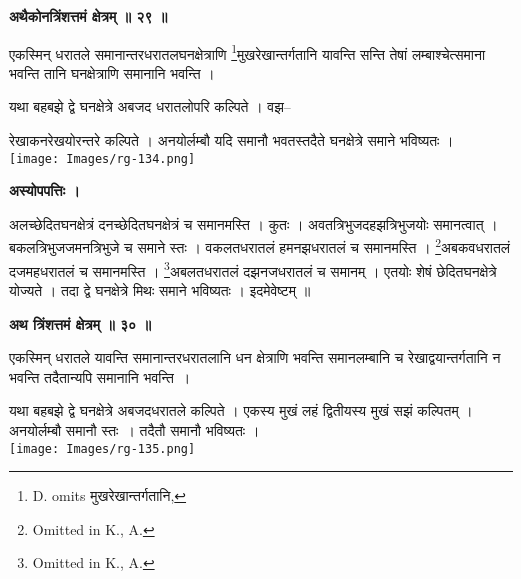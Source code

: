 \documentclass[11pt, openany]{book}
\begin{document}
\begin{center}
\textbf{\large अथैकोनत्रिंशत्तमं क्षेत्रम् ॥ २९ ॥}
\end{center}
\vspace{2mm}

{\ab एकस्मिन् धरातले समानान्तरधरातलघनक्षेत्राणि \renewcommand{\thefootnote}{२}\footnote{{\en D. omits} मुखरेखान्तर्गतानि,}मुखरेखान्तर्गतानि यावन्ति सन्ति तेषां लम्बाश्चेत्समाना भवन्ति तानि घनक्षेत्राणि समानानि भवन्ति ।}\\
\vspace{3mm}

 यथा बहबझे द्वे घनक्षेत्रे अबजद धरातलोपरि कल्पिते । वझ--

\newpage
\begin{vwcol}[widths={0.6,0.4}, sep=.8cm, rule=0pt]
\noindent रेखाकनरेखयोरन्तरे कल्पिते । अनयोर्लम्बौ यदि समानौ भवतस्तदैते घनक्षेत्रे समाने भविष्यतः ।\\
\noindent \texttt{[image: Images/rg-134.png]}   
\end{vwcol}
\vspace{5mm}

\begin{center}
\textbf{अस्योपपत्तिः ।}
\end{center}
\vspace{2mm}

अलच्छेदितघनक्षेत्रं दनच्छेदितघनक्षेत्रं च समानमस्ति । कुतः । अवतत्रिभुजदहझत्रिभुजयोः समानत्वात् । बकलत्रिभुजजमनत्रिभुजे च समाने स्तः । वकलतधरातलं हमनझधरातलं च समानमस्ति ।
\renewcommand{\thefootnote}{१}\footnote{\en Omitted in K., A.}अबकवधरातलं दजमहधरातलं च समानमस्ति । \renewcommand{\thefootnote}{२}\footnote{\en Omitted in K., A.}अबलतधरातलं दझनजधरातलं च समानम् । एतयोः शेषं छेदितघनक्षेत्रे योज्यते । तदा द्वे घनक्षेत्रे मिथः समाने भविष्यतः । इदमेवेष्टम् ॥\\
\begin{center}
\textbf{\large अथ त्रिंशत्तमं क्षेत्रम् ॥ ३० ॥}
\end{center}
\vspace{2mm}

{\ab एकस्मिन् धरातले यावन्ति समानान्तरधरातलानि धन क्षेत्राणि भवन्ति समानलम्बानि च रेखाद्वयान्तर्गतानि न भवन्ति तदैतान्यपि समानानि भवन्ति~।}\\
\vspace{3mm}

\begin{vwcol}[widths={0.6,0.4}, sep=.8cm, rule=0pt]
 यथा बहबझे द्वे घनक्षेत्रे अबजदधरातले कल्पिते । एकस्य मुखं
लहं द्वितीयस्य मुखं सझं कल्पितम् । अनयोर्लम्बौ समानौ स्तः~। तदैतौ समानौ भविष्यतः ।\\
\noindent \texttt{[image: Images/rg-135.png]}   
\end{vwcol}
\vspace{5mm}
\end{document}
